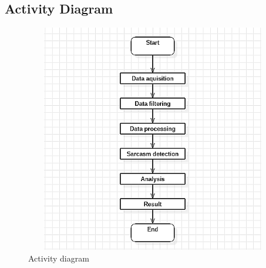 \documentclass[oneside,a4paper,12pt]{book}
\begin{document}
\subsection{Activity Diagram}
\begin{figure}[h!]
  \centering
  \includegraphics[width=13cm,
  height=10cm]{activity.png}
  \caption{Activity diagram}
\end{figure}
\end{document}
